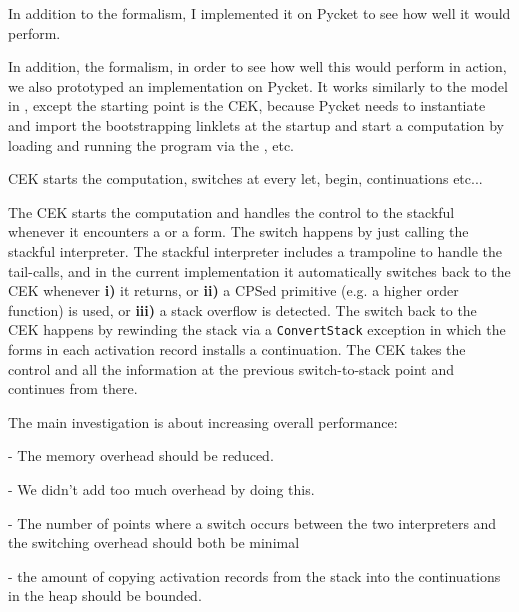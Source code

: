       \begin{paragraph-here}
        In addition to the formalism, I implemented it on Pycket to see how well it would perform.
      \end{paragraph-here}

      In addition, the formalism, in order to see how well this would perform
      in action, we also prototyped an implementation on Pycket. It works similarly to the model in , except
      the starting point is the CEK, because Pycket needs to instantiate and
      import the bootstrapping linklets at the startup and start a
      computation by loading and running the program via the
      ,  etc.

      \begin{paragraph-here}
        CEK starts the computation, switches at every let, begin, continuations etc...
      \end{paragraph-here}

      The CEK starts the computation and handles the control to the stackful
      whenever it encounters a  or a 
      form. The switch happens by just calling the stackful interpreter. The
      stackful interpreter includes a trampoline to handle the tail-calls,
      and in the current implementation it automatically switches back to
      the CEK whenever \textbf{i)} it returns, or \textbf{ii)} a CPSed
      primitive (e.g. a higher order function) is used, or \textbf{iii)} a
      stack overflow is detected. The switch back to the CEK happens by
      rewinding the stack via a \verb|ConvertStack| exception in which the
      forms in each activation record installs a continuation. The CEK takes
      the control and all the information at the previous switch-to-stack
      point and continues from there.

      \begin{show-experiment}
        The main investigation is about increasing overall performance:

        - The memory overhead should be reduced.

        - We didn't add too much overhead by doing this.

          - The number of points where a switch occurs between the two interpreters and the switching overhead should both be minimal

          - the amount of copying activation records from the stack into the continuations in the heap should be bounded.
      \end{show-experiment}

